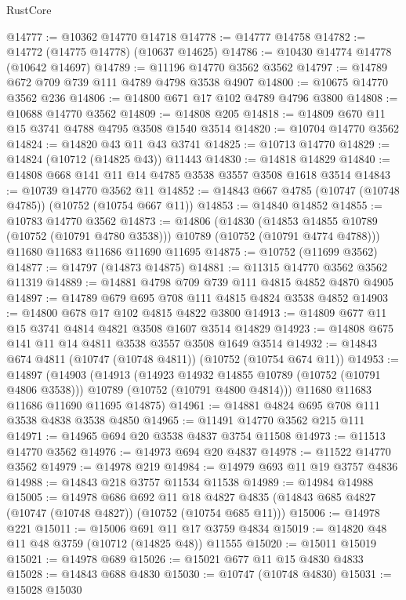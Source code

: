 \begin{lexlean}{RustCore}
\begin{coremodule}
@14777 := @10362 @14770 @14718
@14778 := @14777 @14758
@14782 := @14772 (@14775 @14778) (@10637 @14625)
@14786 := @10430 @14774 @14778 (@10642 @14697)
@14789 := @11196 @14770 @3562 @3562
@14797 := @14789 @672 @709 @739 @111 @4789 @4798 @3538 @4907
@14800 := @10675 @14770 @3562 @236
@14806 := @14800 @671 @17 @102 @4789 @4796 @3800
@14808 := @10688 @14770 @3562
@14809 := @14808 @205
@14818 := @14809 @670 @11 @15 @3741 @4788 @4795 @3508 @1540 @3514
@14820 := @10704 @14770 @3562
@14824 := @14820 @43 @11 @43 @3741
@14825 := @10713 @14770
@14829 := @14824 (@10712 (@14825 @43)) @11443
@14830 := @14818 @14829
@14840 := @14808 @668 @141 @11 @14 @4785 @3538 @3557 @3508 @1618 @3514
@14843 := @10739 @14770 @3562 @11
@14852 := @14843 @667 @4785 (@10747 (@10748 @4785)) (@10752 (@10754 @667 @11))
@14853 := @14840 @14852
@14855 := @10783 @14770 @3562
@14873 := @14806
    (@14830
      (@14853 @14855 @10789 (@10752 (@10791 @4780 @3538)))
      @10789
      (@10752 (@10791 @4774 @4788)))
    @11680
    @11683
    @11686
    @11690
    @11695
@14875 := @10752 (@11699 @3562)
@14877 := @14797 (@14873 @14875)
@14881 := @11315 @14770 @3562 @3562 @11319
@14889 := @14881 @4798 @709 @739 @111 @4815 @4852 @4870 @4905
@14897 := @14789 @679 @695 @708 @111 @4815 @4824 @3538 @4852
@14903 := @14800 @678 @17 @102 @4815 @4822 @3800
@14913 := @14809 @677 @11 @15 @3741 @4814 @4821 @3508 @1607 @3514 @14829
@14923 := @14808 @675 @141 @11 @14 @4811 @3538 @3557 @3508 @1649 @3514
@14932 := @14843 @674 @4811 (@10747 (@10748 @4811)) (@10752 (@10754 @674 @11))
@14953 := @14897
    (@14903
      (@14913
        (@14923 @14932 @14855 @10789 (@10752 (@10791 @4806 @3538)))
        @10789
        (@10752 (@10791 @4800 @4814)))
      @11680
      @11683
      @11686
      @11690
      @11695
      @14875)
@14961 := @14881 @4824 @695 @708 @111 @3538 @4838 @3538 @4850
@14965 := @11491 @14770 @3562 @215 @111
@14971 := @14965 @694 @20 @3538 @4837 @3754 @11508
@14973 := @11513 @14770 @3562
@14976 := @14973 @694 @20 @4837
@14978 := @11522 @14770 @3562
@14979 := @14978 @219
@14984 := @14979 @693 @11 @19 @3757 @4836
@14988 := @14843 @218 @3757 @11534 @11538
@14989 := @14984 @14988
@15005 := @14978
    @686
    @692
    @11
    @18
    @4827
    @4835
    (@14843 @685 @4827 (@10747 (@10748 @4827)) (@10752 (@10754 @685 @11)))
@15006 := @14978 @221
@15011 := @15006 @691 @11 @17 @3759 @4834
@15019 := @14820 @48 @11 @48 @3759 (@10712 (@14825 @48)) @11555
@15020 := @15011 @15019
@15021 := @14978 @689
@15026 := @15021 @677 @11 @15 @4830 @4833
@15028 := @14843 @688 @4830
@15030 := @10747 (@10748 @4830)
@15031 := @15028 @15030

\end{coremodule}
\end{lexlean}
